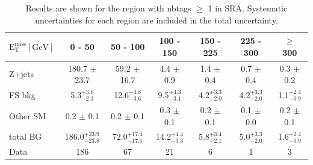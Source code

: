 \begin{table}[htb]
\scriptsize
\begin{center}
\caption{\label{tab:results_withb_SRA} 
Results are shown for the region with nbtags $\geq$ 1 in SRA.
Systematic uncertainties for each region are included in the total uncertainty. 
}
\begin{tabular}{l|c|c|c|c|c|c}
\hline
\hline
$\mathrm{E_{T}^{miss} [GeV]}$ &0 - 50 & 50 - 100 & 100 - 150 & 150 - 225 & 225 - 300 & $\geq$ 300 \\
\hline 
Z+jets&  180.7 $\pm$ 23.7 &  59.2 $\pm$ 16.7 &  4.4 $\pm$ 0.9 &  1.4 $\pm$ 0.4 &  0.7 $\pm$ 0.4 &  0.3 $\pm$ 0.2 \\ 
FS bkg&  5.3$^{+ 3.6}_{- 2.3}$ &  12.6$^{+ 4.8}_{- 3.6}$ &  9.5$^{+ 4.3}_{- 3.1}$ &  4.2$^{+ 3.3}_{- 2.0}$ &  4.2$^{+ 3.3}_{- 2.0}$ &  1.1$^{+ 2.4}_{- 0.9}$ \\ 
Other SM&  0.2 $\pm$ 0.1 &  0.2 $\pm$ 0.1 &  0.3 $\pm$ 0.1 &  0.2 $\pm$ 0.1 &  0.1 $\pm$ 0.0 &  0.2 $\pm$ 0.1 \\ 
\hline 
total BG&  186.0$^{+ 23.9}_{- 23.8}$ &  72.0$^{+ 17.4}_{- 17.1}$ &  14.2$^{+ 4.4}_{- 3.3}$ &  5.8$^{+ 3.4}_{- 2.1}$ &  5.0$^{+ 3.3}_{- 2.0}$ &  1.6$^{+ 2.4}_{- 0.9}$ \\ 
\hline 
Data&  186 &  67 &  21 &  6 &  1 &  3 \\ 
\hline
\hline
\end{tabular}
\end{center}
\end{table}

